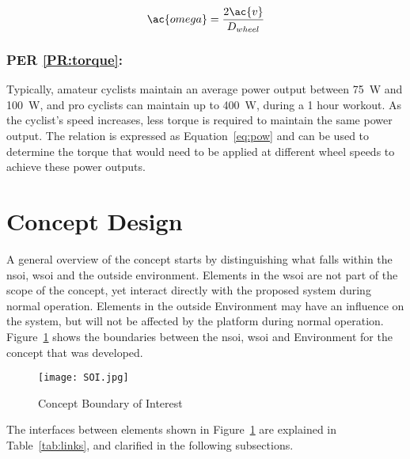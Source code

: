 \begin{equation}
	\ac{omega} = \frac{2 \ac{v}}{D_{wheel}}
	\label{eq:omega}
\end{equation}

\subsubsection{PER \ref{PR:torque}:}

Typically, amateur cyclists maintain an average power output between \SI{75}{\watt} and \SI{100}{\watt}, and pro cyclists can maintain up to \SI{400}{\watt}, during a 1 hour workout. As the cyclist's speed increases, less torque is required to maintain the same power output. The relation is expressed as Equation~\ref{eq:pow} and can be used to determine the torque that would need to be applied at different wheel speeds to achieve these power outputs.

\section{Concept Design}
\label{sec:conc}

A general overview of the concept starts by distinguishing what falls within the \acf{nsoi}, \acf{wsoi} and the outside environment. Elements in the \ac{wsoi} are not part of the scope of the concept, yet interact directly with the proposed system during normal operation. Elements in the outside Environment may have an influence on the system, but will not be affected by the platform during normal operation. Figure~\ref{fig:soi} shows the boundaries between the \ac{nsoi}, \ac{wsoi} and Environment for the concept that was developed.

\begin{figure}[H]
	\begin{center}
		\texttt{[image: SOI.jpg]}
		\caption{Concept Boundary of Interest}
		\label{fig:soi}
	\end{center}
\end{figure}

The interfaces between elements shown in Figure~\ref{fig:soi} are explained in Table~\ref{tab:links}, and clarified in the following subsections.


